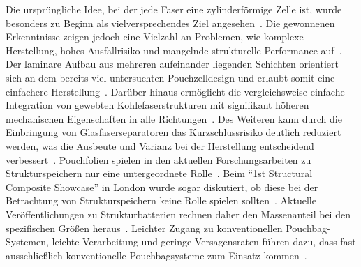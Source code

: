 Die ursprüngliche Idee, bei der jede Faser eine zylinderförmige Zelle ist, wurde besonders zu Beginn als vielversprechendes Ziel angesehen~\cite{Ekstedt2010, Leijonmarck2013, Asp2014}. Die gewonnenen Erkenntnisse zeigen jedoch eine Vielzahl an Problemen, wie komplexe Herstellung, hohes Ausfallrisiko und mangelnde strukturelle Performance auf~\cite{Asp2015,Johannisson2018,Asp2021, Ye2024}. Der laminare Aufbau aus mehreren aufeinander liegenden Schichten orientiert sich an dem bereits viel untersuchten Pouchzelldesign und erlaubt somit eine einfachere Herstellung~\cite{Johannisson2018, Xu2022, Siraj2023}. Darüber hinaus ermöglicht die vergleichsweise einfache Integration von gewebten Kohlefaserstrukturen mit signifikant höheren mechanischen Eigenschaften in alle Richtungen~\cite{Xu2022}. Des Weiteren kann durch die Einbringung von Glasfaserseparatoren das Kurzschlussrisiko deutlich reduziert werden, was die Ausbeute und Varianz bei der Herstellung entscheidend verbessert~\cite{Siraj2023}. Pouchfolien spielen in den aktuellen Forschungsarbeiten zu Strukturspeichern nur eine untergeordnete Rolle~\cite{Jin2023}. Beim "`1st Structural Composite Showcase"' in London wurde sogar diskutiert, ob diese bei der Betrachtung von Strukturspeichern keine Rolle spielen sollten~\cite{Asp2024}. Aktuelle Veröffentlichungen zu Strukturbatterien rechnen daher den Massenanteil bei den spezifischen Größen heraus~\cite{Danzi2021,Ye2024}. Leichter Zugang zu konventionellen Pouchbag-Systemen, leichte Verarbeitung und geringe Versagensraten führen dazu, dass fast ausschließlich konventionelle Pouchbagsysteme zum Einsatz kommen~\cite{Jin2023,Ye2024}.


